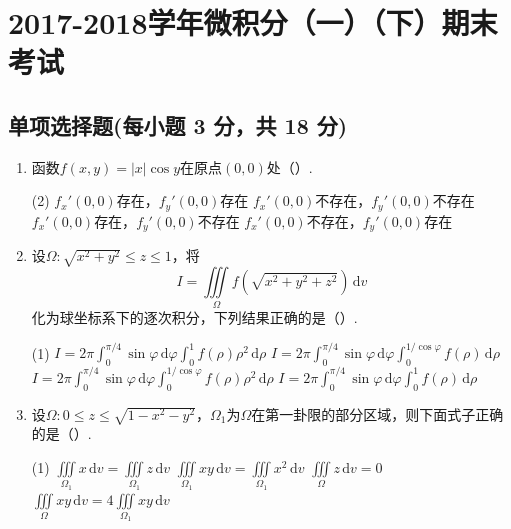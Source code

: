 \documentclass[../Main.tex]{subfiles}
\begin{document}
\chapter{2017-2018学年微积分（一）（下）期末考试}

\section{单项选择题(每小题 3 分，共 18 分)}
\begin{enumerate}
    \item 函数$f(x,y)=|x|\cos y$在原点$(0,0)$处（\qquad）.

          \begin{tasks}[label=\textbf{\Alph*.}, label-width=1.5em, column-sep=1em](2)
              \task $f_{x}'(0,0)$存在，$f_{y}'(0,0)$存在
              \task $f_{x}'(0,0)$不存在，$f_{y}'(0,0)$不存在
              \task $f_{x}'(0,0)$存在，$f_{y}'(0,0)$不存在
              \task $f_{x}'(0,0)$不存在，$f_{y}'(0,0)$存在
          \end{tasks}
          \vspace{1em}

    \item 设$\Omega:\sqrt{x^{2}+y^{2}}\leq z\leq1$，将
          \[
              I=\iiint\limits_{\Omega}f\left(\sqrt{x^{2}+y^{2}+z^{2}}\right)\,\mathrm{d}v
          \]
          化为球坐标系下的逐次积分，下列结果正确的是（\qquad）.

          \begin{tasks}[label=\textbf{\Alph*.}, label-width=1.5em, column-sep=1em](1)
              \task $I=2\pi\displaystyle\int_0^{\pi/4}\sin\varphi\,\mathrm{d}\varphi\int_0^1 f(\rho)\rho^2\,\mathrm{d}\rho$
              \task $I=2\pi\displaystyle\int_0^{\pi/4}\sin\varphi\,\mathrm{d}\varphi\int_0^{1/\cos\varphi} f(\rho)\,\mathrm{d}\rho$
              \task $I=2\pi\displaystyle\int_0^{\pi/4}\sin\varphi\,\mathrm{d}\varphi\int_0^{1/\cos\varphi} f(\rho)\rho^2\,\mathrm{d}\rho$
              \task $I=2\pi\displaystyle\int_0^{\pi/4}\sin\varphi\,\mathrm{d}\varphi\int_0^1 f(\rho)\,\mathrm{d}\rho$
          \end{tasks}
          \vspace{1em}

    \item 设$\Omega:0\leq z\leq\sqrt{1-x^{2}-y^{2}}$，$\Omega_{1}$为$\Omega$在第一卦限的部分区域，则下面式子正确的是（\qquad）.

          \begin{tasks}[label=\textbf{\Alph*.}, label-width=1.5em, column-sep=1em](1)
              \task $\displaystyle\iiint\limits_{\Omega_1}x\,\mathrm{d}v=\iiint\limits_{\Omega_1}z\,\mathrm{d}v$
              \task $\displaystyle\iiint\limits_{\Omega_1}xy\,\mathrm{d}v=\iiint\limits_{\Omega_1}x^2\,\mathrm{d}v$
              \task $\displaystyle\iiint\limits_{\Omega}z\,\mathrm{d}v=0$
              \task $\displaystyle\iiint\limits_{\Omega}xy\,\mathrm{d}v=4\iiint\limits_{\Omega_1}xy\,\mathrm{d}v$
          \end{tasks}
          \vspace{1em}


\end{enumerate}
\end{document}
